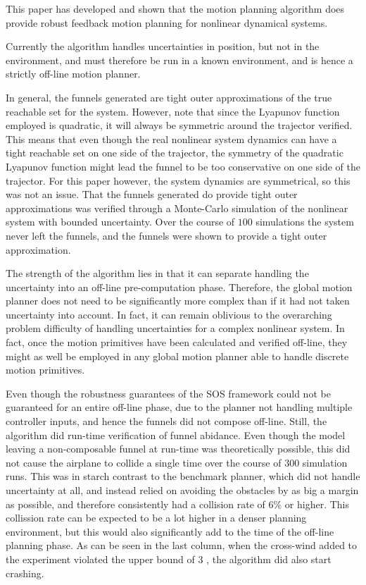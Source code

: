
This paper has developed and shown that the \rrtfunnel{} motion planning
algorithm does provide robust feedback motion planning for nonlinear dynamical
systems.

Currently the algorithm handles uncertainties in position, but not in the
environment, and must therefore be run in a known environment, and is hence a
strictly off-line motion planner.

In general, the funnels generated are tight outer approximations of the true
reachable set for the system. However, note that since the Lyapunov function
employed is quadratic, it will always be symmetric around the trajector
verified. This means that even though the real nonlinear system dynamics can
have a tight reachable set on one side of the trajector, the symmetry of the
quadratic Lyapunov function might lead the funnel to be too conservative on one
side of the trajector. For this paper however, the system dynamics are
symmetrical, so this was not an issue. That the funnels generated do provide
tight outer approximations was verified through a Monte-Carlo simulation
of the nonlinear system with bounded uncertainty. Over the course of \(100\)
simulations the system never left the funnels, and the funnels were shown to
provide a tight outer approximation.


The strength of the algorithm lies in that it can separate handling the
uncertainty into an off-line pre-computation phase. Therefore, the global motion
planner does not need to be significantly more complex than if it had not
taken uncertainty into account. In fact, it can remain oblivious to the
overarching problem difficulty of handling uncertainties for a complex nonlinear
system. In fact, once the motion primitives have been calculated and verified
off-line, they might as well be employed in any global motion planner able to
handle discrete motion primitives.


Even though the robustness guarantees of the SOS framework could not be
guaranteed for an entire off-line phase, due to the planner not handling
multiple controller inputs, and hence the funnels did not compose off-line.
Still, the \rrtfunnel{} algorithm did run-time verification of funnel abidance.
Even though the model leaving a non-composable funnel at run-time was
theoretically possible, this did not cause the airplane to collide a single time
over the course of \(300\) simulation runs. This was in starch contrast to the
benchmark planner, which did not handle uncertainty at all, and instead relied
on avoiding the obstacles by as big a margin as possible, and therefore
consistently had a collision rate of \(6\%\) or higher. This collission rate can
be expected to be a lot higher in a denser planning environment, but this would
also significantly add to the time of the off-line planning phase. As can be
seen in the last column, when the cross-wind added to the experiment violated
the upper bound of \(3\) , the \rrtfunnel{} algorithm did also
start crashing.
